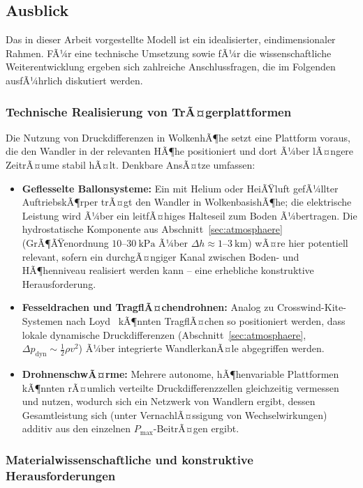 ﻿\documentclass[a4paper,12pt]{article}
\theoremstyle{definition}
\begin{document}
\subsection{Ausblick}
\label{sec:ausblick}

Das in dieser Arbeit vorgestellte Modell ist ein idealisierter,
eindimensionaler Rahmen. FÃ¼r eine technische Umsetzung sowie fÃ¼r die
wissenschaftliche Weiterentwicklung ergeben sich zahlreiche
Anschlussfragen, die im Folgenden ausfÃ¼hrlich diskutiert werden.

\subsubsection{Technische Realisierung von TrÃ¤gerplattformen}

Die Nutzung von Druckdifferenzen in WolkenhÃ¶he setzt eine Plattform
voraus, die den Wandler in der relevanten HÃ¶he positioniert und dort
Ã¼ber lÃ¤ngere ZeitrÃ¤ume stabil hÃ¤lt. Denkbare AnsÃ¤tze umfassen:

\begin{itemize}
	\item \textbf{Geflesselte Ballonsysteme:} Ein mit Helium oder
	HeiÃŸluft gefÃ¼llter AuftriebskÃ¶rper trÃ¤gt den Wandler in
	WolkenbasishÃ¶he; die elektrische Leistung wird Ã¼ber ein
	leitfÃ¤higes Halteseil zum Boden Ã¼bertragen. Die hydrostatische
	Komponente aus Abschnitt~\ref{sec:atmosphaere} (GrÃ¶ÃŸenordnung
	$10$--$30\ \mathrm{kPa}$ Ã¼ber $\Delta h \approx 1$--$3\ \mathrm{km}$)
	wÃ¤re hier potentiell relevant, sofern ein durchgÃ¤ngiger Kanal
	zwischen Boden- und HÃ¶henniveau realisiert werden kann -- eine
	erhebliche konstruktive Herausforderung.
	\item \textbf{Fesseldrachen und TragflÃ¤chendrohnen:} Analog zu
	Crosswind-Kite-Systemen nach Loyd~\cite{loyd1980} kÃ¶nnten
	TragflÃ¤chen so positioniert werden, dass lokale dynamische
	Druckdifferenzen (Abschnitt~\ref{sec:atmosphaere},
	$\Delta p_{\mathrm{dyn}} \sim \tfrac{1}{2}\rho v^2$) Ã¼ber
	integrierte WandlerkanÃ¤le abgegriffen werden.
	\item \textbf{DrohnenschwÃ¤rme:} Mehrere autonome, hÃ¶henvariable
	Plattformen kÃ¶nnten rÃ¤umlich verteilte Druckdifferenzzellen
	gleichzeitig vermessen und nutzen, wodurch sich ein Netzwerk von
	Wandlern ergibt, dessen Gesamtleistung sich (unter
	VernachlÃ¤ssigung von Wechselwirkungen) additiv aus den einzelnen
	$P_{\max}$-BeitrÃ¤gen ergibt.
\end{itemize}

\subsubsection{Materialwissenschaftliche und konstruktive Herausforderungen}
\end{document}
